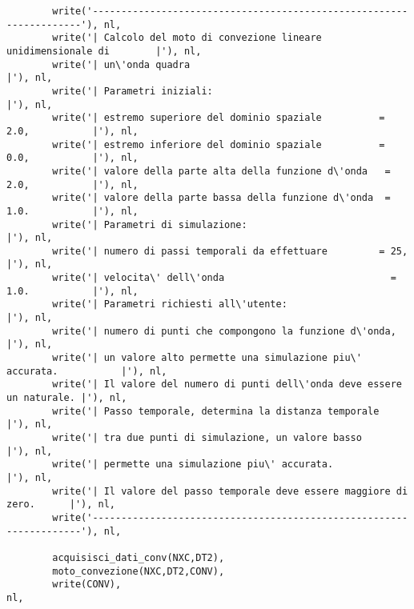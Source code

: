 \begin{verbatim}
        write('--------------------------------------------------------------------'), nl,
        write('| Calcolo del moto di convezione lineare unidimensionale di        |'), nl,
        write('| un\'onda quadra                                                   |'), nl,
        write('| Parametri iniziali:                                              |'), nl,
        write('| estremo superiore del dominio spaziale          = 2.0,           |'), nl,
        write('| estremo inferiore del dominio spaziale          = 0.0,           |'), nl, 
        write('| valore della parte alta della funzione d\'onda   = 2.0,           |'), nl, 
        write('| valore della parte bassa della funzione d\'onda  = 1.0.           |'), nl,
        write('| Parametri di simulazione:                                        |'), nl,
        write('| numero di passi temporali da effettuare         = 25,            |'), nl, 
        write('| velocita\' dell\'onda                             = 1.0.           |'), nl, 
        write('| Parametri richiesti all\'utente:                                  |'), nl, 
        write('| numero di punti che compongono la funzione d\'onda,               |'), nl,
        write('| un valore alto permette una simulazione piu\' accurata.           |'), nl,
        write('| Il valore del numero di punti dell\'onda deve essere un naturale. |'), nl,
        write('| Passo temporale, determina la distanza temporale                 |'), nl,
        write('| tra due punti di simulazione, un valore basso                    |'), nl,
        write('| permette una simulazione piu\' accurata.                          |'), nl,
        write('| Il valore del passo temporale deve essere maggiore di zero.      |'), nl,
        write('--------------------------------------------------------------------'), nl,

        acquisisci_dati_conv(NXC,DT2),                                                 
        moto_convezione(NXC,DT2,CONV), 
        write(CONV),                                                                   nl,


\end{verbatim}
